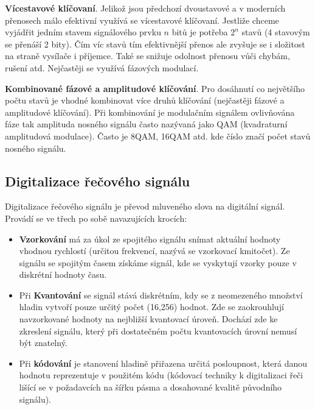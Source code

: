 \textbf{Vícestavové klíčovaní}. Jelikož jsou předchozí dvoustavové a v moderních přenosech málo efektivní využívá se vícestavové klíčovaní. Jestliže chceme vyjádřit jedním stavem signálového prvku $n$ bitů je potřeba $2^n$ stavů (4 stavovým se přenáší 2 bity). Čím víc stavů tím efektivnější přenos ale zvyšuje se i složitost na straně vysílače i příjemce. Také se snižuje odolnost přenosu vůči chybám, rušení atd. Nejčastěji se využívá fázových modulací.


\textbf{Kombinované fázové a amplitudové klíčování}. Pro dosáhnutí co největšího počtu stavů je vhodné kombinovat více druhů klíčování (nejčastěji fázové a amplitudové klíčování). Při kombinování je modulačním signálem ovlivňována fáze tak amplituda nosného signálu často nazývaná jako QAM (kvadraturní amplitudová modulace). Často je 8QAM, 16QAM atd. kde číslo značí počet stavů nosného signálu.

\subsection{Digitalizace řečového signálu}

Digitalizace řečového signálu je převod mluveného slova na digitální signál. Provádí se ve třech po sobě navazujících krocích:
\begin{itemize}[noitemsep]
    \item \textbf{Vzorkování} má za úkol ze spojitého signálu snímat aktuální hodnoty vhodnou rychlostí (určitou frekvencí, nazývá se vzorkovací kmitočet). Ze signálu se spojitým časem získáme signál, kde se vyskytují vzorky pouze v diskrétní hodnoty času.
    \item Při \textbf{Kvantování} se signál stává diskrétním, kdy se z neomezeného množství hladin vytvoří pouze určitý počet (16,256) hodnot. Zde se zaokrouhlují navzorkované hodnoty na nejbližší kvantovací úroveň. Dochází zde ke zkreslení signálu, který při dostatečném počtu kvantovacích úrovní nemusí být znatelný. 
    \item Při \textbf{kódování} je stanovení hladině přiřazena určitá posloupnost, která danou hodnotu reprezentuje v použitém kódu (kódovací techniky k digitalizaci řeči lišící se v požadavcích na šířku pásma a dosahované kvalitě původního signálu).  
\end{itemize}

